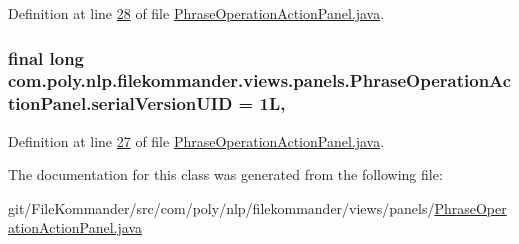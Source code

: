 Definition at line \hyperlink{L28}{28} of file \hyperlink{}{Phrase\-Operation\-Action\-Panel.\-java}.

\hypertarget{classcom_1_1poly_1_1nlp_1_1filekommander_1_1views_1_1panels_1_1_phrase_operation_action_panel_a422015c9557a6c51405b4eab27b52452}{
\subsubsection[{serial\-Version\-U\-I\-D}]{\setlength{\rightskip}{0pt plus 5cm}final long com.\-poly.\-nlp.\-filekommander.\-views.\-panels.\-Phrase\-Operation\-Action\-Panel.\-serial\-Version\-U\-I\-D = 1\-L\hspace{0.3cm}{\ttfamily [static]}, {\ttfamily [private]}}}\label{classcom_1_1poly_1_1nlp_1_1filekommander_1_1views_1_1panels_1_1_phrase_operation_action_panel_a422015c9557a6c51405b4eab27b52452}


Definition at line \hyperlink{L27}{27} of file \hyperlink{}{Phrase\-Operation\-Action\-Panel.\-java}.



The documentation for this class was generated from the following file\-:\begin{DoxyCompactItemize}
\item 
git/\-File\-Kommander/src/com/poly/nlp/filekommander/views/panels/\hyperlink{_phrase_operation_action_panel_8java}{Phrase\-Operation\-Action\-Panel.\-java}\end{DoxyCompactItemize}
